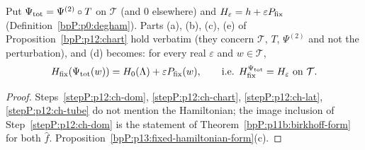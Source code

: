 \begin{proposition}\label{bpP:p13:chart}
Put $\Psi_{\rm tot}=\Psi^{(2)}\circ T$ on $\mathcal T$ (and $0$ elsewhere) and $H_\varepsilon=h+\varepsilon P_{\rm fix}$ (Definition~\ref{bpP:p0:degham}). Parts (a), (b), (c), (e) of Proposition~\ref{bpP:p12:chart} hold verbatim (they concern $\mathcal T$, $T$, $\Psi^{(2)}$ and not the perturbation), and (d) becomes: for every real $\varepsilon$ and $w\in\mathcal T$,
\[H_{\rm fix}(\Psi_{\rm tot}(w))=H_0(\Lambda)+\varepsilon P_{\rm fix}(w),\qquad\text{i.e. }H_{\rm fix}^{\Psi_{\rm tot}}=H_\varepsilon\text{ on }\mathcal T.\]
\end{proposition}
\begin{proof}
\label{stepP:p13:ch-same} Steps~\ref{stepP:p12:ch-dom}, \ref{stepP:p12:ch-chart}, \ref{stepP:p12:ch-lat}, \ref{stepP:p12:ch-tube} do not mention the Hamiltonian; the image inclusion of Step~\ref{stepP:p12:ch-dom} is the statement of Theorem~\ref{bpP:p11b:birkhoff-form} for both $\hat f$.
\label{stepP:p13:ch-ham} Proposition~\ref{bpP:p13:fixed-hamiltonian-form}(c).
\end{proof}


